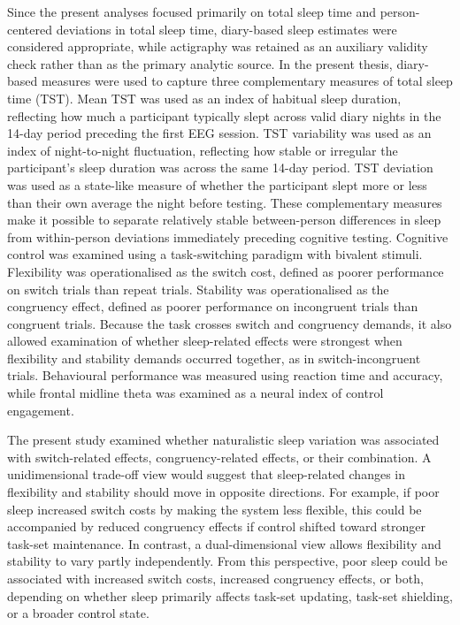 \documentclass[12pt,a4paper]{report}
\begin{document}
Since the present analyses focused primarily on total sleep time and person-centered deviations in total sleep time, diary-based sleep estimates were considered appropriate, while actigraphy was retained as an auxiliary validity check rather than as the primary analytic source. In the present thesis, diary-based measures were used to capture three complementary measures of total sleep time (TST).
Mean TST was used as an index of habitual sleep duration, reflecting how much a participant typically slept across valid diary nights in the 14-day period preceding the first EEG session. TST variability was used as an index of night-to-night fluctuation, reflecting how stable or irregular the participant's sleep duration was across the same 14-day period. TST deviation was used as a state-like measure of whether the participant slept more or less than their own average the night before testing. These complementary measures make it possible to separate relatively stable between-person differences in sleep from within-person deviations immediately preceding cognitive testing. Cognitive control was examined using a task-switching paradigm with bivalent stimuli. Flexibility was operationalised as the switch cost, defined as poorer performance on switch trials than repeat trials. Stability was operationalised as the congruency effect, defined as poorer performance on incongruent trials than congruent trials. Because the task crosses switch and congruency demands, it also allowed examination of whether sleep-related effects were strongest when flexibility and stability demands occurred together, as in switch-incongruent trials. Behavioural performance was measured using reaction time and accuracy, while frontal midline theta was examined as a neural index of control engagement. 

The present study examined whether naturalistic sleep variation was associated with switch-related effects, congruency-related effects, or their combination. A unidimensional trade-off view would suggest that sleep-related changes in flexibility and stability should move in opposite directions. For example, if poor sleep increased switch costs by making the system less flexible, this could be accompanied by reduced congruency effects if control shifted toward stronger task-set maintenance. In contrast, a dual-dimensional view allows flexibility and stability to vary partly independently. From this perspective, poor sleep could be associated with increased switch costs, increased congruency effects, or both, depending on whether sleep primarily affects task-set updating, task-set shielding, or a broader control state.
\end{document}
